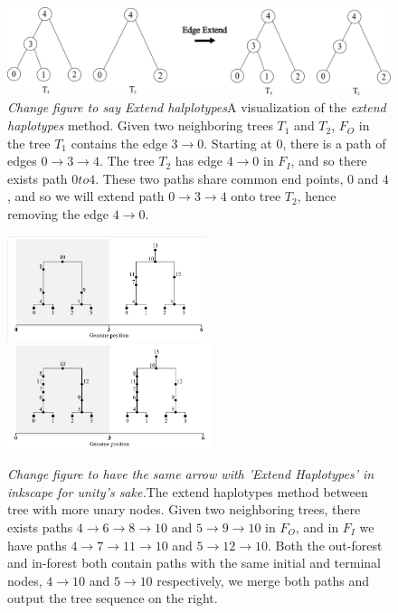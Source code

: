 \documentclass[10pt,twoside,lineno]{gsajnl}
\newcommand{\comment}[1]{{\color{violet} \it #1}}
\begin{document}
\begin{figure}[!ht]
\begin{center}
	\includegraphics[width=5in]{edge_extend_method.pdf}
\end{center}
\caption{\comment{Change figure to say Extend halplotypes}A visualization of the \textit{extend haplotypes} method. Given two neighboring trees $T_1$ and $T_2$, $F_O$ in the tree $T_1$ contains the edge $3\to 0$. Starting at $0$, there is a path of edges $0 \to 3 \to 4$. The tree $T_2$ has edge $4 \to 0$ in $F_I$, and so there exists path $0 to 4$. These two paths share common end points, $0$ and $4$, and so we will extend path $0 \to 3 \to 4$ onto tree $T_2$, hence removing the edge $4\to 0$.
    \label{fig:extending_diagram}
}
\end{figure}

\begin{figure}[!ht]
	\begin{center}
		\includegraphics[width=0.4\linewidth, height=1.2in]{EH-Ex2.pdf}
		\includegraphics[width=0.4\linewidth, height=1.2in]{EH-extended-Ex2.pdf}
	\end{center}
	\caption{\comment{Change figure to have the same arrow with 'Extend Haplotypes' in inkscape for unity's sake.}The extend haplotypes method between tree with more unary nodes. Given two neighboring trees, there exists paths $4\to 6\to8\to10$ and $5\to 9\to 10$ in $F_O$, and in $F_I$ we have paths $4\to 7\to 11\to 10$ and $5\to 12\to 10$. Both the out-forest and in-forest both contain paths with the same initial and terminal nodes, $4\to 10$ and $5\to 10$ respectively, we merge both paths and output the tree sequence on the right.}
	\label{fig:complicated_extending_diagram}
\end{figure}
\end{document}
